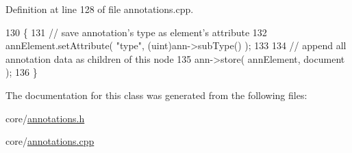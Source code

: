 Definition at line 128 of file annotations.\+cpp.


\begin{DoxyCode}
130 \{
131     \textcolor{comment}{// save annotation's type as element's attribute}
132     annElement.setAttribute( \textcolor{stringliteral}{"type"}, (uint)ann->subType() );
133 
134     \textcolor{comment}{// append all annotation data as children of this node}
135     ann->store( annElement, document );
136 \}
\end{DoxyCode}


The documentation for this class was generated from the following files\+:\begin{DoxyCompactItemize}
\item 
core/\hyperlink{annotations_8h}{annotations.\+h}\item 
core/\hyperlink{annotations_8cpp}{annotations.\+cpp}\end{DoxyCompactItemize}
